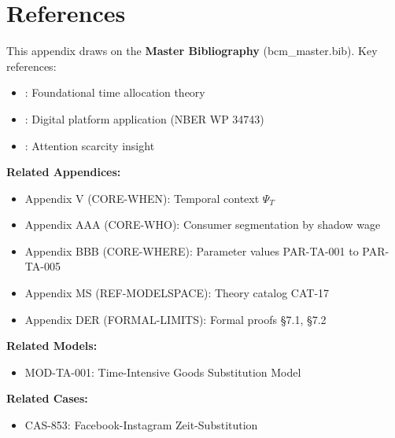 \section{References}
\label{sec:pt-references}

This appendix draws on the \textbf{Master Bibliography} (bcm\_master.bib). Key references:

\begin{itemize}[nosep]
\item \citet{PAP-becker1965theory}: Foundational time allocation theory
\item \citet{PAP-goodman2026timeintensive}: Digital platform application (NBER WP 34743)
\item \citet{PAP-simon1971designing}: Attention scarcity insight
\end{itemize}

\nocite{bcm_master}


\begin{tcolorbox}[colback=white, colframe=black,
    title=Cross-References]

\textbf{Related Appendices:}
\begin{itemize}[nosep]
\item Appendix V (CORE-WHEN): Temporal context $\Psi_T$
\item Appendix AAA (CORE-WHO): Consumer segmentation by shadow wage
\item Appendix BBB (CORE-WHERE): Parameter values PAR-TA-001 to PAR-TA-005
\item Appendix MS (REF-MODELSPACE): Theory catalog CAT-17
\item Appendix DER (FORMAL-LIMITS): Formal proofs §7.1, §7.2
\end{itemize}

\textbf{Related Models:}
\begin{itemize}[nosep]
\item MOD-TA-001: Time-Intensive Goods Substitution Model
\end{itemize}

\textbf{Related Cases:}
\begin{itemize}[nosep]
\item CAS-853: Facebook-Instagram Zeit-Substitution
\end{itemize}

\end{tcolorbox}


